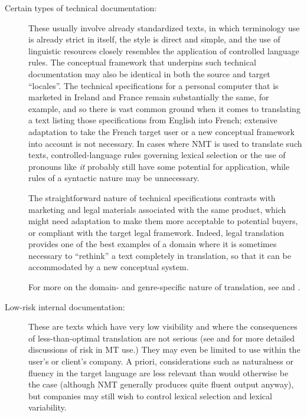 \documentclass[output=paper,colorlinks,citecolor=brown,
]{langscibook}
\begin{document}
\begin{description}\sloppy
\item [Certain types of technical documentation:] These usually involve already standardized texts, in which terminology use is already strict in itself, the style is direct and simple, and the use of linguistic resources closely resembles the application of controlled language rules. The conceptual framework that underpins such technical documentation may also be identical in both the source and target “locales”. The technical specifications for a personal computer that is marketed in Ireland and France remain substantially the same, for example, and so there is vast common ground when it comes to translating a text listing those specifications from English into French; extensive adaptation to take the French target user or a new conceptual framework into account is not necessary. In cases where NMT is used to translate such texts, controlled-language rules governing lexical selection or the use of pronouns like \textit{it} probably still have some potential for application, while rules of a syntactic nature may be unnecessary.


The straightforward nature of technical specifications contrasts with marketing and legal materials associated with the same product, which might need adaptation to make them more acceptable to potential buyers, or compliant with the target legal framework. Indeed, legal translation provides one of the best examples of a domain where it is sometimes necessary to “rethink” a text completely in translation, so that it can be accommodated by a new conceptual system.

For more on the domain- and genre-specific nature of translation, see \citet{Olohan2015} and \citet{Šarcevic1997}.

\item[Low-risk internal documentation:]

These are texts which have very low visibility and where the consequences of less-than-optimal translation are not serious (see \citealt{CanforaOttmann2020} and  for more detailed discussions of risk in MT use.) They may even be limited to use within the user’s or client’s company. A priori, considerations such as naturalness or fluency in the target language are less relevant than would otherwise be the case (although NMT generally produces quite fluent output anyway), but companies may still wish to control lexical selection and lexical variability.


\end{description}
\end{document}
